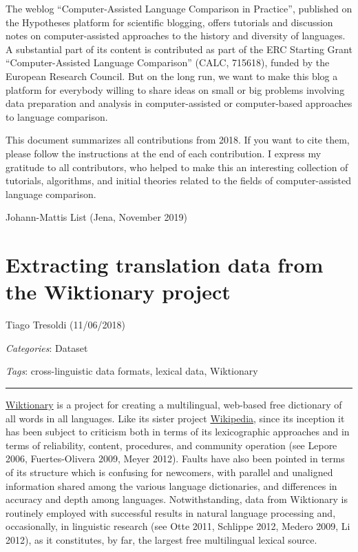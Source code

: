 \documentclass[
  a4paper,
  14pt,
  oneside,
  tablecaptionabove
]{scrbook}
\begin{document}
The weblog ``Computer-Assisted Language Comparison in Practice'', published on the Hypotheses platform
for scientific blogging, offers tutorials and discussion notes on computer-assisted approaches to the
history and diversity of languages. A substantial part of its content is contributed as part of the
ERC Starting Grant ``Computer-Assisted Language Comparison'' (CALC, 715618), funded by the European
Research Council. But on the long run, we want to make this blog a platform for everybody willing to
share ideas on small or big problems involving data preparation and analysis in computer-assisted
or computer-based approaches to language comparison.

This document summarizes all contributions from 2018. If you want to cite them, please follow the
instructions at the end of each contribution. I express my gratitude to all contributors, who helped
to make this an interesting collection of tutorials, algorithms, and initial theories
related to the fields of computer-assisted language comparison.

\begin{flushright}
\noindent Johann-Mattis List (Jena, November 2019)
\end{flushright}

\newpage
\section*{Extracting translation data from the Wiktionary project}

Tiago Tresoldi (11/06/2018)

\emph{Categories}: Dataset

\emph{Tags}: cross-linguistic data formats, lexical data, Wiktionary

\begin{center}\rule{0.5\linewidth}{1pt}\end{center}

\href{https://wiktionary.org}{Wiktionary} is a project for creating a
multilingual, web-based free dictionary of all words in all languages.
Like its sister project \href{https://wikipedia.org}{Wikipedia}, since
its inception it has been subject to criticism both in terms of its
lexicographic approaches and in terms of reliability, content,
procedures, and community operation (see Lepore 2006, Fuertes-Olivera
2009, Meyer 2012). Faults have also been pointed in terms of its
structure which is confusing for newcomers, with parallel and unaligned
information shared among the various language dictionaries, and
differences in accuracy and depth among languages. Notwithstanding, data
from Wiktionary is routinely employed with successful results in natural
language processing and, occasionally, in linguistic research (see Otte
2011, Schlippe 2012, Medero 2009, Li 2012), as it constitutes, by far,
the largest free multilingual lexical source.
\end{document}
